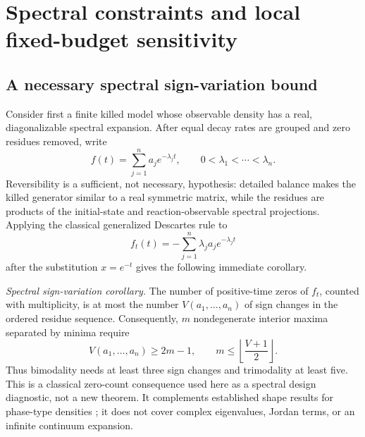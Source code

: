 \documentclass[aps,pre,reprint,amsmath,amssymb,longbibliography,floatfix]{revtex4-2}
\begin{document}
\section{Spectral constraints and local fixed-budget sensitivity}
\label{sec:modality-design}

\subsection{A necessary spectral sign-variation bound}
\label{sec:spectral-bound}

Consider first a finite killed model whose observable density has a real,
diagonalizable spectral expansion. After equal decay rates are grouped and
zero residues removed, write
\begin{equation}
f(t)=\sum_{j=1}^{n}a_j e^{-\lambda_jt},
\qquad 0<\lambda_1<\cdots<\lambda_n.
\label{eq:spectral-density}
\end{equation}
Reversibility is a sufficient, not necessary, hypothesis: detailed balance
makes the killed generator similar to a real symmetric matrix, while the
residues are products of the initial-state and reaction-observable spectral
projections. Applying the classical generalized Descartes rule
\cite{jameson2006descartes} to
\begin{equation}
f_t(t)=-\sum_{j=1}^{n}\lambda_ja_j e^{-\lambda_jt}
\label{eq:spectral-derivative}
\end{equation}
after the substitution \(x=e^{-t}\) gives the following immediate corollary.

\emph{Spectral sign-variation corollary.} The number of positive-time zeros
of \(f_t\), counted with multiplicity, is at most the number
\(V(a_1,\ldots,a_n)\) of sign changes in the ordered residue sequence.
Consequently, \(m\) nondegenerate interior maxima separated by minima require
\begin{equation}
V(a_1,\ldots,a_n)\geq 2m-1,
\qquad
m\leq\left\lfloor\frac{V+1}{2}\right\rfloor.
\label{eq:spectral-mode-bound}
\end{equation}
Thus bimodality needs at least three sign changes and trimodality at least
five. This is a classical zero-count consequence used here as a spectral
design diagnostic, not a new theorem. It complements established shape
results for phase-type densities \cite{yao2002phase}; it does not cover
complex eigenvalues, Jordan terms, or an infinite continuum expansion.
\end{document}

